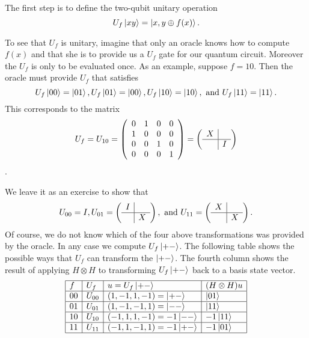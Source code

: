 \documentclass [12pt]{article}
\theoremstyle{definition}
\begin{document}
The first step is to define the two-qubit unitary operation 
\[U_f\ket{xy} = \ket{x,y\oplus f(x)}.\]

To see that $U_f$ is unitary, imagine that only an oracle knows how to compute $f(x)$ and that she is to provide us a $U_f$ gate for our quantum circuit. Moreover
the $U_f$ is only to be evaluated once. As an example, suppose $f=10$. Then the oracle must provide $U_f$ that satisfies 
\[U_f\ket{00} = \ket{01}, U_f\ket{01}=\ket{00}, U_f\ket{10} = \ket{10}, \mbox{ and } U_f\ket{11} = \ket{11}.\]
 This corresponds to the matrix
\[U_f = U_{10} =
\left(\begin{array}{cccc}
0 & 1 & 0 & 0\\
1 &  0 & 0 & 0 \\
0 &  0 & 1 & 0 \\
0 &  0 & 0 & 1 \\
\end{array}\right) =
\left(\begin{array}{c|c}
X & \\
\hline
 &  I \\
\end{array}\right)
\].

We leave it as an exercise to show that 
\[U_{00} = I, U_{01} = 
\left(\begin{array}{c|c}
I & \\
\hline
 &  X \\
\end{array}\right), \mbox{ and }
 U_{11} = 
\left(\begin{array}{c|c}
X & \\
\hline
 &  X \\
\end{array}\right).
\]
Of course, we do not know which of the four above transformations was provided by the oracle. In any case we compute $U_f\ket{+-}$.
The following table shows the possible ways that $U_f$ can transform the  $\ket{+-}$.
The fourth column shows the result of applying $H\otimes H$ to transforming $U_f\ket{+-}$ back to a basis state vector.
\[\begin{array}{|l|l|l|l|}
\hline
f & U_f &  u = U_f\ket{+-} & (H\otimes H)u\\
\hline
00 & U_{00} & (1,-1,1,-1) = \ket{+-} & \ket{01}\\
\hline
01 & U_{01} & (1,-1,-1,1) = \ket{--} & \ket{11}\\%
\hline
10 & U_{10} & (-1,1,1,-1) =  -1\ket{--} & -1\ket{11}\\
\hline
11 & U_{11} & (-1,1,-1,1) = -1\ket{+-} & -1\ket{01}\\
\hline
\end{array}
\]
\end{document}
